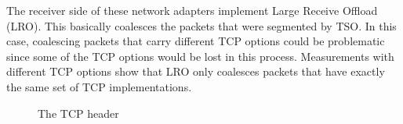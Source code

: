 \documentclass[letterpaper,10pt,english]{sphinxmanual}
\begin{document}
\sphinxAtStartPar
The receiver side of these network adapters implement Large Receive Offload (LRO). This basically coalesces the packets that were segmented by TSO. In this case, coalescing packets that carry different TCP options could be problematic since some of the TCP options would be lost in this process. Measurements with different TCP options show that LRO only coalesces packets that have exactly the same set of TCP implementations.
\begin{figure}[htbp]\centering\capstart{}\caption{The TCP header}\label{\detokenize{mptcp:id83}}\end{figure}
\end{document}
